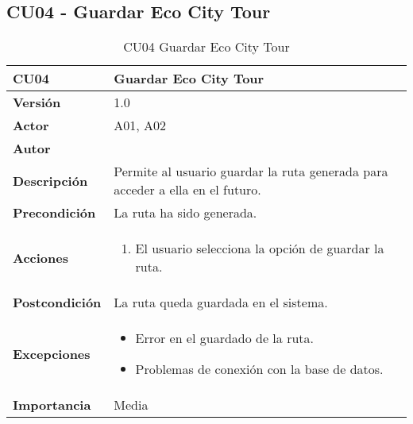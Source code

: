 \subsection{CU04 - Guardar Eco City Tour}
\begin{table}[p]
	\centering
	\begin{tabularx}{\linewidth}{ p{} p{} }
		\toprule
		\textbf{CU04}    & \textbf{Guardar Eco City Tour} \\
		\toprule
		\textbf{Versión}              & 1.0    \\
		\textbf{Actor}                & A01, A02 \\
		\textbf{Autor}                & \autor \\
		\textbf{Descripción}          & Permite al usuario guardar la ruta generada para acceder a ella en el futuro. \\
		\textbf{Precondición}         & La ruta ha sido generada. \\
		\textbf{Acciones}             &
		\begin{enumerate}
			\def\labelenumi{\arabic{enumi}.}
			\tightlist
			\item El usuario selecciona la opción de guardar la ruta.
		\end{enumerate}\\
		\textbf{Postcondición}        & La ruta queda guardada en el sistema. \\
		\textbf{Excepciones}          & 
		\begin{itemize}
			\tightlist
			\item Error en el guardado de la ruta.
			\item Problemas de conexión con la base de datos.
		\end{itemize}\\
		\textbf{Importancia}          & Media \\
		\bottomrule
	\end{tabularx}
	\caption{CU04 Guardar Eco City Tour}
\end{table}

